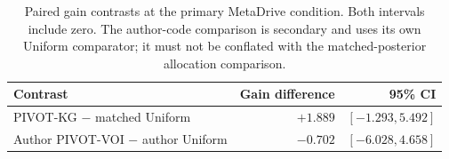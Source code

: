\begin{table}[t]
\centering
\small
\caption{Paired gain contrasts at the primary MetaDrive condition. Both intervals include zero. The author-code comparison is secondary and uses its own Uniform comparator; it must not be conflated with the matched-posterior allocation comparison.}
\label{add20260923:metadrive:contrasts}
\begin{tabular}{lrr}
\hline
Contrast & Gain difference & 95\% CI \\
\hline
PIVOT-KG $-$ matched Uniform & $+1.889$ & $[-1.293,5.492]$ \\
Author PIVOT-VOI $-$ author Uniform & $-0.702$ & $[-6.028,4.658]$ \\
\hline
\end{tabular}
\end{table}
